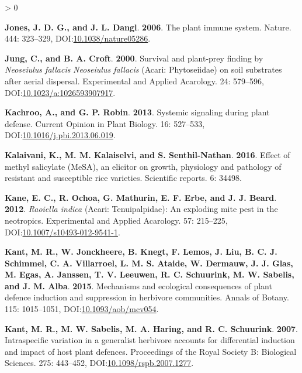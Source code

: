 \documentclass{ufdissertation}[overrideChapters] %
\newlength{\cslhangindent}
\newenvironment{CSLReferences}[2] %
 {%
  \setlength{\parindent}{0pt}
  \ifodd #1 \everypar{\setlength{\hangindent}{\cslhangindent}}\ignorespaces\fi
  \ifnum #2 > 0
  \setlength{\parskip}{#2\baselineskip}
  \fi
 }%
 {}
\begin{document}
{\begin{CSLReferences}{1}{1}
\leavevmode{}%
\textbf{Jones, J. D. G., and J. L. Dangl}. \textbf{2006}. The plant immune system. Nature. 444: 323--329, DOI:\href{https://doi.org/10.1038/nature05286}{10.1038/nature05286}.

\leavevmode{}%
\textbf{Jung, C., and B. A. Croft}. \textbf{2000}. Survival and plant-prey finding by {\emph{Neoseiulus fallacis}} {\emph{Neoseiulus fallacis}} ({Acari}: {Phytoseiidae}) on soil substrates after aerial dispersal. Experimental and Applied Acarology. 24: 579--596, DOI:\href{https://doi.org/10.1023/a:1026593907917}{10.1023/a:1026593907917}.

\leavevmode{}%
\textbf{Kachroo, A., and G. P. Robin}. \textbf{2013}. Systemic signaling during plant defense. Current Opinion in Plant Biology. 16: 527--533, DOI:\href{https://doi.org/10.1016/j.pbi.2013.06.019}{10.1016/j.pbi.2013.06.019}.

\leavevmode{}%
\textbf{Kalaivani, K., M. M. Kalaiselvi, and S. Senthil-Nathan}. \textbf{2016}. Effect of methyl salicylate {(MeSA)}, an elicitor on growth, physiology and pathology of resistant and susceptible rice varieties. Scientific reports. 6: 34498.

\leavevmode{}%
\textbf{Kane, E. C., R. Ochoa, G. Mathurin, E. F. Erbe, and J. J. Beard}. \textbf{2012}. {\emph{Raoiella indica}} ({Acari}: {Tenuipalpidae}): An exploding mite pest in the neotropics. Experimental and Applied Acarology. 57: 215--225, DOI:\href{https://doi.org/10.1007/s10493-012-9541-1}{10.1007/s10493-012-9541-1}.

\leavevmode{}%
\textbf{Kant, M. R., W. Jonckheere, B. Knegt, F. Lemos, J. Liu, B. C. J. Schimmel, C. A. Villarroel, L. M. S. Ataide, W. Dermauw, J. J. Glas, M. Egas, A. Janssen, T. V. Leeuwen, R. C. Schuurink, M. W. Sabelis, and J. M. Alba}. \textbf{2015}. Mechanisms and ecological consequences of plant defence induction and suppression in herbivore communities. Annals of Botany. 115: 1015--1051, DOI:\href{https://doi.org/10.1093/aob/mcv054}{10.1093/aob/mcv054}.

\leavevmode{}%
\textbf{Kant, M. R., M. W. Sabelis, M. A. Haring, and R. C. Schuurink}. \textbf{2007}. Intraspecific variation in a generalist herbivore accounts for differential induction and impact of host plant defences. Proceedings of the Royal Society B: Biological Sciences. 275: 443--452, DOI:\href{https://doi.org/10.1098/rspb.2007.1277}{10.1098/rspb.2007.1277}.


\end{CSLReferences}}
\end{document}
